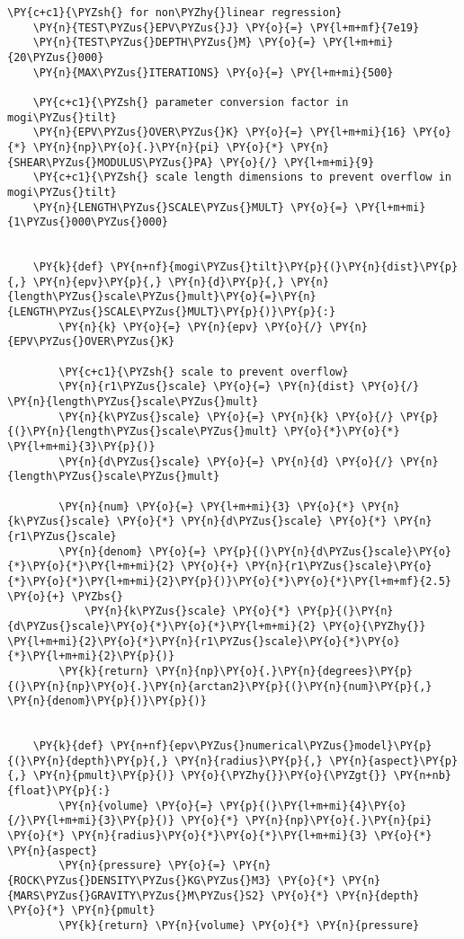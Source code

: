 \begin{tcolorbox}[breakable, size=fbox, boxrule=1pt, pad at break*=1mm,colback=cellbackground, colframe=cellborder]
\begin{Verbatim}[commandchars=\\\{\}]
    \PY{c+c1}{\PYZsh{} for non\PYZhy{}linear regression}
    \PY{n}{TEST\PYZus{}EPV\PYZus{}J} \PY{o}{=} \PY{l+m+mf}{7e19}
    \PY{n}{TEST\PYZus{}DEPTH\PYZus{}M} \PY{o}{=} \PY{l+m+mi}{20\PYZus{}000}
    \PY{n}{MAX\PYZus{}ITERATIONS} \PY{o}{=} \PY{l+m+mi}{500}
    
    \PY{c+c1}{\PYZsh{} parameter conversion factor in mogi\PYZus{}tilt}
    \PY{n}{EPV\PYZus{}OVER\PYZus{}K} \PY{o}{=} \PY{l+m+mi}{16} \PY{o}{*} \PY{n}{np}\PY{o}{.}\PY{n}{pi} \PY{o}{*} \PY{n}{SHEAR\PYZus{}MODULUS\PYZus{}PA} \PY{o}{/} \PY{l+m+mi}{9}
    \PY{c+c1}{\PYZsh{} scale length dimensions to prevent overflow in mogi\PYZus{}tilt}
    \PY{n}{LENGTH\PYZus{}SCALE\PYZus{}MULT} \PY{o}{=} \PY{l+m+mi}{1\PYZus{}000\PYZus{}000}
    
    
    \PY{k}{def} \PY{n+nf}{mogi\PYZus{}tilt}\PY{p}{(}\PY{n}{dist}\PY{p}{,} \PY{n}{epv}\PY{p}{,} \PY{n}{d}\PY{p}{,} \PY{n}{length\PYZus{}scale\PYZus{}mult}\PY{o}{=}\PY{n}{LENGTH\PYZus{}SCALE\PYZus{}MULT}\PY{p}{)}\PY{p}{:}
        \PY{n}{k} \PY{o}{=} \PY{n}{epv} \PY{o}{/} \PY{n}{EPV\PYZus{}OVER\PYZus{}K}
    
        \PY{c+c1}{\PYZsh{} scale to prevent overflow}
        \PY{n}{r1\PYZus{}scale} \PY{o}{=} \PY{n}{dist} \PY{o}{/} \PY{n}{length\PYZus{}scale\PYZus{}mult}
        \PY{n}{k\PYZus{}scale} \PY{o}{=} \PY{n}{k} \PY{o}{/} \PY{p}{(}\PY{n}{length\PYZus{}scale\PYZus{}mult} \PY{o}{*}\PY{o}{*} \PY{l+m+mi}{3}\PY{p}{)}
        \PY{n}{d\PYZus{}scale} \PY{o}{=} \PY{n}{d} \PY{o}{/} \PY{n}{length\PYZus{}scale\PYZus{}mult}
    
        \PY{n}{num} \PY{o}{=} \PY{l+m+mi}{3} \PY{o}{*} \PY{n}{k\PYZus{}scale} \PY{o}{*} \PY{n}{d\PYZus{}scale} \PY{o}{*} \PY{n}{r1\PYZus{}scale}
        \PY{n}{denom} \PY{o}{=} \PY{p}{(}\PY{n}{d\PYZus{}scale}\PY{o}{*}\PY{o}{*}\PY{l+m+mi}{2} \PY{o}{+} \PY{n}{r1\PYZus{}scale}\PY{o}{*}\PY{o}{*}\PY{l+m+mi}{2}\PY{p}{)}\PY{o}{*}\PY{o}{*}\PY{l+m+mf}{2.5} \PY{o}{+} \PYZbs{}
            \PY{n}{k\PYZus{}scale} \PY{o}{*} \PY{p}{(}\PY{n}{d\PYZus{}scale}\PY{o}{*}\PY{o}{*}\PY{l+m+mi}{2} \PY{o}{\PYZhy{}} \PY{l+m+mi}{2}\PY{o}{*}\PY{n}{r1\PYZus{}scale}\PY{o}{*}\PY{o}{*}\PY{l+m+mi}{2}\PY{p}{)}
        \PY{k}{return} \PY{n}{np}\PY{o}{.}\PY{n}{degrees}\PY{p}{(}\PY{n}{np}\PY{o}{.}\PY{n}{arctan2}\PY{p}{(}\PY{n}{num}\PY{p}{,} \PY{n}{denom}\PY{p}{)}\PY{p}{)}
    
    
    \PY{k}{def} \PY{n+nf}{epv\PYZus{}numerical\PYZus{}model}\PY{p}{(}\PY{n}{depth}\PY{p}{,} \PY{n}{radius}\PY{p}{,} \PY{n}{aspect}\PY{p}{,} \PY{n}{pmult}\PY{p}{)} \PY{o}{\PYZhy{}}\PY{o}{\PYZgt{}} \PY{n+nb}{float}\PY{p}{:}
        \PY{n}{volume} \PY{o}{=} \PY{p}{(}\PY{l+m+mi}{4}\PY{o}{/}\PY{l+m+mi}{3}\PY{p}{)} \PY{o}{*} \PY{n}{np}\PY{o}{.}\PY{n}{pi} \PY{o}{*} \PY{n}{radius}\PY{o}{*}\PY{o}{*}\PY{l+m+mi}{3} \PY{o}{*} \PY{n}{aspect}
        \PY{n}{pressure} \PY{o}{=} \PY{n}{ROCK\PYZus{}DENSITY\PYZus{}KG\PYZus{}M3} \PY{o}{*} \PY{n}{MARS\PYZus{}GRAVITY\PYZus{}M\PYZus{}S2} \PY{o}{*} \PY{n}{depth} \PY{o}{*} \PY{n}{pmult}
        \PY{k}{return} \PY{n}{volume} \PY{o}{*} \PY{n}{pressure}
    

\end{Verbatim}
\end{tcolorbox}
